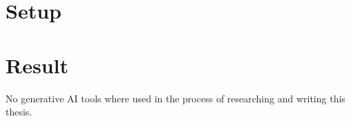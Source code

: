 \documentclass[draft,final]{vutinfth} %
\begin{document}
\section{Setup}

\section{Result}




\backmatter

\begin{aitools}
    No generative AI tools where used in the process of researching and writing this thesis.
\end{aitools}

\listoffigures %

\cleardoublepage %
\listoftables %

\listofalgorithms
{}

\printindex

\printglossaries



\end{document}
